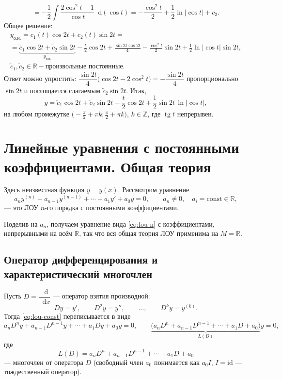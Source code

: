 \documentclass[12pt,a4paper]{article}
\numberwithin{equation}{section}
\newcommand{\R}{\mathbb{R}}
\newcommand{\Z}{\mathbb{Z}}
\newcommand{\dd}{\mathop{}\!\mathrm{d}}
\begin{document}
\begin{exampleHSE}[№\,578: \(\ddot y+4y=\operatorname{tg}t\)]
\[=-\frac12\int\frac{2\cos^2t-1}{\cos t}\dd(\cos t)
=-\frac{\cos^2t}{2}+\frac12\ln|\cos t|+\tilde c_2.
\]
Общее решение:
\begin{gather*}
y_{\text{о.н.}}=c_1(t)\cos 2t+c_2(t)\sin 2t=\\
=\underbrace{\tilde c_1\cos2t+\tilde c_2\sin2t}_{y_{\text{о.о.}}}
-\frac t2\cos2t+\frac{\sin2t\cos2t}{4}-\frac{\cos^2t}{2}\sin2t+\frac12\ln|\cos t|\sin2t,\\
\tilde c_1,\tilde c_2\in\R-\text{произвольные постоянные}.
\end{gather*}
Ответ можно упростить: \(\dfrac{\sin2t}{4}\bigl(\cos2t-2\cos^2t\bigr)=-\dfrac{\sin2t}{4}\) пропорционально \(\sin2t\) и поглощается слагаемым \(\tilde c_2\sin2t\). Итак,
\[
y=\tilde c_1\cos2t+\tilde c_2\sin2t-\frac t2\cos2t+\frac12\sin2t\,\ln|\cos t|,
\]
на любом промежутке \(\bigl(-\frac\pi2+\pi k;\frac\pi2+\pi k\bigr)\), \(k\in\Z\), где \(\operatorname{tg}t\) непрерывен.
\end{exampleHSE}

\section[ЛУ с постоянными коэффициентами]{Линейные уравнения с постоянными коэффициентами. Общая теория}

Здесь неизвестная функция \(y=y(x)\). Рассмотрим уравнение
\begin{equation}
a_ny^{(n)}+a_{n-1}y^{(n-1)}+\cdots+a_1y'+a_0y=0,
\qquad a_n\neq0,\quad a_i=\mathrm{const}\in\R,
\label{eq:lou-const}
\end{equation}
--- это ЛОУ \(n\)-го порядка с постоянными коэффициентами.

Поделив на \(a_n\), получаем уравнение вида \eqref{eq:lou-n} с коэффициентами, непрерывными на всём \(\R\), так что вся общая теория ЛОУ применима на \(M=\R\).

\subsection{Оператор дифференцирования и характеристический многочлен}

Пусть \(D=\dfrac{\dd}{\dd x}\) --- оператор взятия производной:
\[
Dy=y',\qquad D^2y=y'',\qquad\ldots,\qquad D^ky=y^{(k)}.
\]
Тогда \eqref{eq:lou-const} переписывается в виде
\[
a_nD^ny+a_{n-1}D^{n-1}y+\cdots+a_1Dy+a_0y=0,
\qquad
\underbrace{\bigl(a_nD^n+a_{n-1}D^{n-1}+\cdots+a_1D+a_0\bigr)}_{L(D)}y=0,
\]
где
\[
L(D)=a_nD^n+a_{n-1}D^{n-1}+\cdots+a_1D+a_0
\]
--- многочлен от оператора \(D\) (свободный член \(a_0\) понимается как \(a_0I\), \(I=\mathrm{id}\) --- тождественный оператор).
\end{document}
